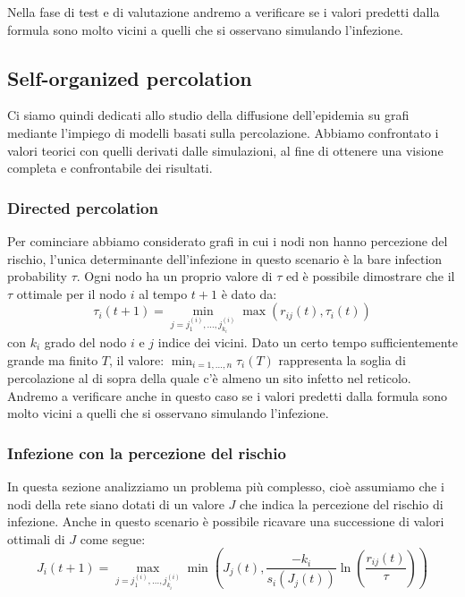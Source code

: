 Nella fase di test e di valutazione andremo a verificare se i valori predetti dalla formula sono molto vicini a quelli
che si osservano simulando l'infezione.

\subsection{Self-organized percolation}\label{subsec:self-organized-percolation}
Ci siamo quindi dedicati allo studio della diffusione dell'epidemia su grafi mediante l'impiego di modelli basati sulla percolazione.
Abbiamo confrontato i valori teorici con quelli derivati dalle simulazioni,
al fine di ottenere una visione completa e confrontabile dei risultati.

\subsubsection{Directed percolation}\label{subsubsec:directed-percolation}
Per cominciare abbiamo considerato grafi in cui i nodi non hanno percezione del rischio, l'unica determinante 
dell'infezione in questo scenario è la bare infection probability $\tau$.
Ogni nodo ha un proprio valore di $\tau$ ed è possibile dimostrare che il $\tau$ ottimale per il nodo $i$ al tempo $t+1$ è dato da:
\begin{equation}
    \tau_{i}(t+1) = \min_{j= j^{(i)}_{1},\dots, j^{(i)}_{k_{i}}}\max(r_{ij}(t), \tau_{i}(t))\label{eq:directed-percolation}
\end{equation}
con $k_{i}$ grado del nodo $i$ e $j$ indice dei vicini.
Dato un certo tempo sufficientemente grande ma finito $T$, il valore: $\min_{i=1,\dots,n}\tau_{i}(T)$ rappresenta
la soglia di percolazione al di sopra della quale c'è almeno un sito infetto nel reticolo.
Andremo a verificare anche in questo caso se i valori predetti dalla formula sono molto vicini a quelli che si osservano
simulando l'infezione.

\subsubsection{Infezione con la percezione del rischio}\label{subsubsec:infezione-con-la-percezione-del-rischio}
In questa sezione analizziamo un problema più complesso, cioè assumiamo che i nodi della rete siano dotati di
un valore $J$ che indica la percezione del rischio di infezione.
Anche in questo scenario è possibile ricavare una successione di valori ottimali di $J$ come segue:
\begin{equation}
    J_{i}(t+1) = \max_{j= j^{(i)}_{1},\dots,j^{(i)}_{k_{i}}}\min\left(J_{j}(t),\frac{-k_{ i}}{s_{i}(J_{j}(t))}\ln\left(\frac{r_{ij}(t)}{\tau}\right)\right)\label{eq:risk-perception}
\end{equation}

